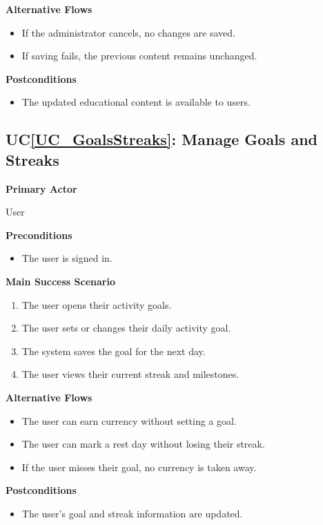 \documentclass[12pt]{article}
\newcounter{ucnum} %
\newcommand{\ucref}[1]{UC\ref{#1}}
\begin{document}
\textbf{Alternative Flows}
\begin{itemize}
\item If the administrator cancels, no changes are saved.
\item If saving fails, the previous content remains unchanged.
\end{itemize}

\textbf{Postconditions}
\begin{itemize}
\item The updated educational content is available to users.
\end{itemize}


\label{UC_GoalsStreaks}
\subsection{\ucref{UC_GoalsStreaks}: Manage Goals and Streaks}

\textbf{Primary Actor}

User

\textbf{Preconditions}
\begin{itemize}
\item The user is signed in.
\end{itemize}

\textbf{Main Success Scenario}
\begin{enumerate}
\item The user opens their activity goals.
\item The user sets or changes their daily activity goal.
\item The system saves the goal for the next day.
\item The user views their current streak and milestones.
\end{enumerate}

\textbf{Alternative Flows}
\begin{itemize}
\item The user can earn currency without setting a goal.
\item The user can mark a rest day without losing their streak.
\item If the user misses their goal, no currency is taken away.
\end{itemize}

\textbf{Postconditions}
\begin{itemize}
\item The user's goal and streak information are updated.
\end{itemize}
\end{document}
